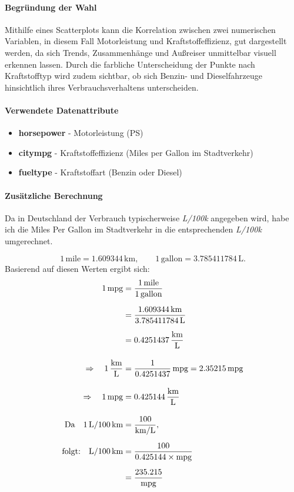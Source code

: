 \documentclass[a4paper,12pt]{article}
\begin{document}
\paragraph{Begründung der Wahl}
Mithilfe eines Scatterplots kann die Korrelation zwischen zwei numerischen Variablen, in diesem Fall Motorleistung und Kraftstoffeffizienz,
gut dargestellt werden, da sich Trends, Zusammenhänge und Außreiser unmittelbar visuell erkennen lassen.
Durch die farbliche Unterscheidung der Punkte nach Kraftstofftyp wird zudem sichtbar, ob sich Benzin- und Dieselfahrzeuge hinsichtlich ihres Verbrauchsverhaltens unterscheiden.


\paragraph{Verwendete Datenattribute}
\begin{itemize}
  \item \textbf{horsepower} - Motorleistung (PS)
  \item \textbf{citympg} - Kraftstoffeffizienz (Miles per Gallon im Stadtverkehr)
  \item \textbf{fueltype} - Kraftstoffart (Benzin oder Diesel)
\end{itemize}


\paragraph{Zusätzliche Berechnung} \break
Da in Deutschland der Verbrauch typischerweise \textit{L/100k} angegeben wird, habe ich die Miles Per Gallon im Stadtverkehr in die entsprechenden \textit{L/100k} umgerechnet.

 \break

\[
1\,\text{mile} = 1.609344\,\text{km}, 
\qquad 
1\,\text{gallon} = 3.785411784\,\text{L}.
\]
Basierend auf diesen Werten ergibt sich:
\[
\begin{aligned}
1\,\text{mpg} 
&= \frac{1\,\text{mile}}{1\,\text{gallon}} \\[6pt]
&= \frac{1.609344\,\text{km}}{3.785411784\,\text{L}} \\[6pt]
&= 0.4251437\,\frac{\text{km}}{\text{L}} \\[10pt]
\Rightarrow \quad
1\,\frac{\text{km}}{\text{L}} 
&= \frac{1}{0.4251437}\,\text{mpg} 
= 2.35215\,\text{mpg} \\[10pt]
\Rightarrow \quad
1\,\text{mpg} 
&= 0.425144\,\frac{\text{km}}{\text{L}} \\[10pt]
\text{Da} \quad
1\,\text{L}/100\,\text{km} 
&= \frac{100}{\text{km}/\text{L}}, \\[6pt]
\text{folgt:} \quad
\text{L/100\,km} 
&= \frac{100}{0.425144 \times \text{mpg}} \\[6pt]
&= \frac{235.215}{\text{mpg}}
\end{aligned}
\]
\end{document}
